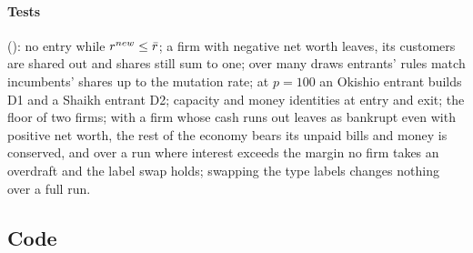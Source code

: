 \paragraph{Tests} (): no entry while $r^{new} \le \bar r$; a
firm with negative net worth leaves, its customers are shared out and shares still sum to
one; over many draws entrants' rules match incumbents' shares up to the mutation rate; at
$p = 100$ an Okishio entrant builds D1 and a Shaikh entrant D2; capacity and money identities
at entry and exit; the floor of two firms; with  a firm whose cash runs
out leaves as bankrupt even with positive net worth, the rest of the economy bears its unpaid
bills and money is conserved, and over a run where interest exceeds the margin no firm takes
an overdraft and the label swap holds; swapping the type labels changes nothing over a
full run.

\subsection*{Code}
